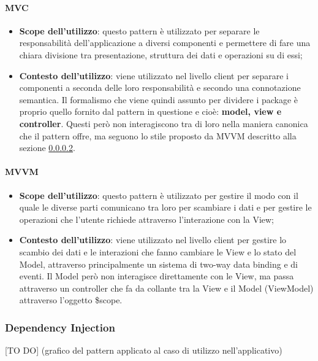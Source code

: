 		\paragraph{MVC} %
		\label{par:mvc}
			\begin{itemize}
				\item \textbf{Scope dell'utilizzo}: questo pattern è utilizzato per separare le responsabilità dell’applicazione a diversi componenti e permettere di fare una chiara divisione tra presentazione, struttura dei dati e operazioni su di essi;

				\item \textbf{Contesto dell'utilizzo}: viene utilizzato nel livello client per separare i componenti a seconda delle loro responsabilità e secondo una connotazione semantica. Il formalismo che viene quindi assunto per dividere i package è proprio quello fornito dal pattern in questione e cioè: \textbf{model, view e controller}. Questi però non interagiscono tra di loro nella maniera canonica che il pattern offre, ma seguono lo stile proposto da MVVM descritto alla sezione \ref{par:mvvm}.
			\end{itemize}

		\paragraph{MVVM} %
		\label{par:mvvm}
			\begin{itemize}
				\item \textbf{Scope dell'utilizzo}: questo pattern è utilizzato per gestire il modo con il quale le diverse parti comunicano tra loro per scambiare i dati e per gestire le operazioni che l'utente richiede attraverso l'interazione con la View;

				\item \textbf{Contesto dell'utilizzo}: viene utilizzato nel livello client per gestire lo scambio dei dati e le interazioni che fanno cambiare le View e lo stato del Model, attraverso principalmente un sistema di two-way data binding e di eventi. Il Model però non interagisce direttamente con le View, ma passa attraverso un controller che fa da collante tra la View e il Model (ViewModel) attraverso l'oggetto \$scope.
			\end{itemize}

	\subsubsection{Dependency Injection} %
	\label{ssub:dependency_injection}
	[TO DO] (grafico del pattern applicato al caso di utilizzo nell'applicativo)

